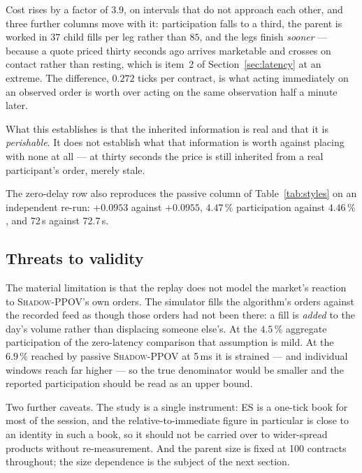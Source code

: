 \documentclass[11pt]{article}
\newcommand{\pov}{\textsc{Shadow-PPOV}}
\begin{document}
Cost rises by a factor of $3.9$, on intervals that do not approach each other,
and three further columns move with it: participation falls to a third, the
parent is worked in $37$ child fills per leg rather than $85$, and the legs
finish \emph{sooner} --- because a quote priced thirty seconds ago arrives
marketable and crosses on contact rather than resting, which is item~2 of
Section~\ref{sec:latency} at an extreme. The difference, $0.272$ ticks per
contract, is what acting immediately on an observed order is worth over acting
on the same observation half a minute later.

What this establishes is that
the inherited information is real and that it is \emph{perishable}. It does not
establish what that information is worth against placing with none at all --- at
thirty seconds the price is still inherited from a real participant's order,
merely stale.

The zero-delay row also reproduces the passive column of Table~\ref{tab:styles}
on an independent re-run: $+0.0953$ against $+0.0955$, $4.47\,\%$ participation
against $4.46\,\%$, and 72\,s against 72.7\,s.

\subsection{Threats to validity}

The material limitation is that the replay does not model the market's reaction
to \pov{}'s own orders. The simulator fills the algorithm's
orders against the recorded feed as though those orders had not been there:
a fill is \emph{added} to the day's volume rather than displacing someone else's.
At the $4.5\,\%$ aggregate participation of the zero-latency comparison that
assumption is mild. At the $6.9\,\%$ reached by passive \pov{} at 5\,ms it is strained --- and
individual windows reach far higher --- so the true denominator would be smaller
and the reported participation should be read as an upper bound.

Two further caveats. The study is a single instrument: ES is a one-tick book for
most of the session, and the relative-to-immediate figure in particular is close
to an identity in such a book, so it should not be carried over to wider-spread
products without re-measurement. And the parent size is fixed at 100 contracts
throughout; the size dependence is the subject of the next section.

\end{document}
